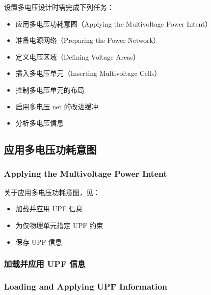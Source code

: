 设置多电压设计时需完成下列任务：
\begin{itemize}
  \item 应用多电压功耗意图（Applying the Multivoltage Power Intent）
  \item 准备电源网络（Preparing the Power Network）
  \item 定义电压区域（Defining Voltage Areas）
  \item 插入多电压单元（Inserting Multivoltage Cells）
  \item 控制多电压单元的布局
  \item 启用多电压 net 的改进缓冲
  \item 分析多电压信息
\end{itemize}

\subsection{应用多电压功耗意图}
\subsubsection*{Applying the Multivoltage Power Intent}

关于应用多电压功耗意图，见：
\begin{itemize}
  \item 加载并应用 UPF 信息
  \item 为仅物理单元指定 UPF 约束
  \item 保存 UPF 信息
\end{itemize}

\subsubsection{加载并应用 UPF 信息}
\subsubsection*{Loading and Applying UPF Information}


